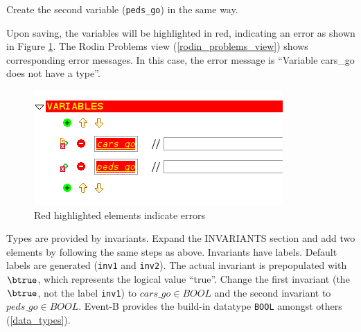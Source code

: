 
Create the second variable (\texttt{peds\_go}) in the same way.


Upon saving, the variables will be highlighted in red, indicating an error as shown in Figure \ref{fig_tut_03_error}.  The \textsf{Rodin Problems} view (\ref{rodin_problems_view}) shows corresponding error messages. In this case, the error message is ``Variable cars\_go does not have a type''.

\begin{figure}[!ht]
\begin{center}
	\includegraphics[]{img/tutorial/tut_03_error.png}
	\caption{Red highlighted elements indicate errors}
	\label{fig_tut_03_error}
\end{center}
\end{figure}

Types are provided by invariants. Expand the \textsf{INVARIANTS} section and add two elements by following the same steps as above.  Invariants have labels.  Default labels are generated (\texttt{inv1} and \texttt{inv2}).  The actual invariant is prepopulated with $\btrue$, which represents the logical value ``true''.
Change the first invariant (the $\btrue$, not the label \texttt{inv1}) to $cars\_go \in  BOOL$ and the second invariant to $peds\_go \in  BOOL$.
Event-B provides the build-in datatype \texttt{BOOL} amongst others (\ref{data_types}).


